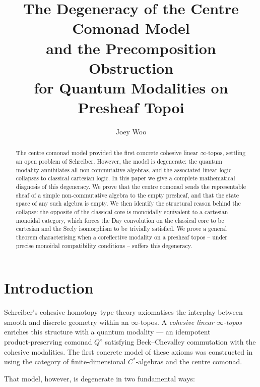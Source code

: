 \documentclass[12pt,a4paper]{article}
\theoremstyle{plain}
\theoremstyle{definition}
\begin{document}
\title{\Large\bfseries The Degeneracy of the Centre Comonad Model\\ and the Precomposition Obstruction\\ for Quantum Modalities on Presheaf Topoi}
\author{Joey Woo}
\date{}

\maketitle

\begin{abstract}
The centre comonad model \cite{Woo2026} provided the first concrete cohesive linear \(\infty\)-topos, settling an open problem of Schreiber.  However, the model is degenerate: the quantum modality annihilates all non‑commutative algebras, and the associated linear logic collapses to classical cartesian logic.  In this paper we give a complete mathematical diagnosis of this degeneracy.  We prove that the centre comonad sends the representable sheaf of a simple non‑commutative algebra to the empty presheaf, and that the state space of any such algebra is empty.  We then identify the structural reason behind the collapse: the opposite of the classical core is monoidally equivalent to a cartesian monoidal category, which forces the Day convolution on the classical core to be cartesian and the Seely isomorphism to be trivially satisfied.  We prove a general theorem characterising when a coreflective modality on a presheaf topos -- under precise monoidal compatibility conditions -- suffers this degeneracy.
\end{abstract}

\section{Introduction}
\label{sec:intro}

Schreiber's cohesive homotopy type theory \cite{Schreiber13} axiomatises the interplay between smooth and discrete geometry within an \(\infty\)-topos.  A \emph{cohesive linear \(\infty\)-topos} enriches this structure with a quantum modality --- an idempotent product‑preserving comonad \(Q^{\diamond}\) satisfying Beck--Chevalley commutation with the cohesive modalities.  The first concrete model of these axioms was constructed in \cite{Woo2026} using the category of finite‑dimensional \(C^{*}\)-algebras and the centre comonad.

That model, however, is degenerate in two fundamental ways:
\end{document}
